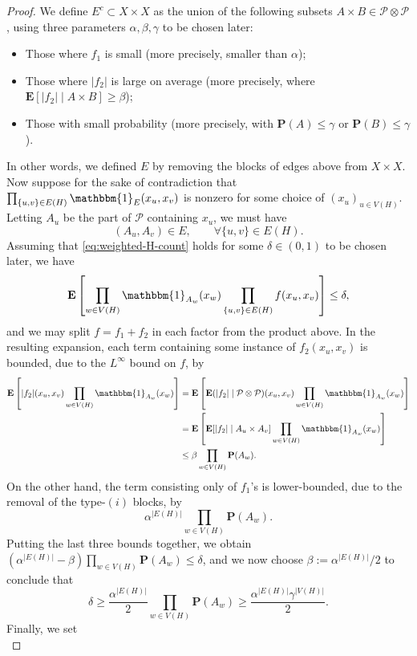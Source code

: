 \documentclass[reqno,11pt]{amsart}
\theoremstyle{definition}
\theoremstyle{remark}
\numberwithin{equation}{section}
\renewcommand{\P}{\mathbf{P}}
\newcommand{\E}{\mathbf{E}}
\newcommand{\mP}{\mathcal{P}}
\newcommand{\one}{\mathbbm{1}}
\begin{document}
\begin{proof}
We define $E^c \subset X \times X$ as the union of the following subsets $A \times B \in \mP \otimes \mP$, using three parameters $\alpha, \beta, \gamma$ to be chosen later:
\begin{itemize}
    \item[$(i)$.] Those where $f_1$ is small (more precisely, smaller than $\alpha$);
    \item[$(ii)$.] Those where $|f_2|$ is large on average (more precisely, where $\E[|f_2| \mid A \times B] \ge \beta$);
    \item[$(iii)$.] Those with small probability (more precisely, with $\P(A) \le \gamma$ or $\P(B) \le \gamma$).
\end{itemize}
In other words, we defined $E$ by removing the blocks of edges above from $X \times X$. Now suppose for the sake of contradiction that $\prod_{\{u, v\} \in E(H)} \one_E(x_u, x_v)$ is nonzero for some choice of $(x_u)_{u \in V(H)}$. Letting $A_u$ be the part of $\mP$ containing $x_u$, we must have
\[
    (A_u, A_v) \in E,
    \qquad
    \forall \{u, v\} \in E(H).
\]
Assuming that \cref{eq:weighted-H-count} holds for some $\delta \in (0, 1)$ to be chosen later, we have
\[
    \E \left[ \prod_{w \in V(H)} \one_{A_w}(x_w) \prod_{\{u, v\} \in E(H)} f(x_u, x_v) \right] \le \delta,
\]
and we may split $f = f_1 + f_2$ in each factor from the product above. In the resulting expansion, each term containing some instance of $f_2(x_u, x_v)$ is bounded, due to the $L^\infty$ bound on $f$, by
\[
\begin{aligned}
     \E \left[ |f_2|(x_u, x_v) \prod_{w \in V(H)} \one_{A_w}(x_w) \right]
     &=
     \E \left[ \E(|f_2| \mid \mP \otimes \mP)(x_u, x_v) \prod_{w \in V(H)} \one_{A_w}(x_w) \right]
     \\
     &=
     \E \left[ \E[|f_2| \mid A_u \times A_v] \prod_{w \in V(H)} \one_{A_w}(x_w) \right]
     \\
     &\le 
     \beta \prod_{w \in V(H)} \P(A_w).
\end{aligned}
\]
On the other hand, the term consisting only of $f_1$'s is lower-bounded, due to the removal of the type-$(i)$ blocks, by
\[
    \alpha^{|E(H)|} \prod_{w \in V(H)} \P(A_w).
\]
Putting the last three bounds together, we obtain $\left(\alpha^{|E(H)|} - \beta \right) \prod_{w \in V(H)} \P(A_w) \le \delta$, 
and we now choose $\beta := \alpha^{|E(H)|}/2$ to conclude that
\[
    \delta \ge \frac{\alpha^{|E(H)|}}{2} \prod_{w \in V(H)} \P(A_w)
    \ge 
    \frac{\alpha^{|E(H)|} \gamma^{|V(H)|}}{2}.
\]
Finally, we set 
\begin{equation} \label{eq:delta-choice}

\end{equation}
\end{proof}
\end{document}
